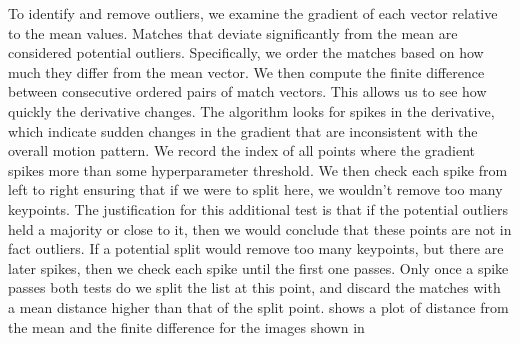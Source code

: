 To identify and remove outliers, we examine the gradient of each vector relative to the mean values. Matches that deviate significantly from the mean are considered potential outliers. Specifically, we order the matches based on how much they differ from the mean vector. We then compute the finite difference between consecutive ordered pairs of match vectors. This allows us to see how quickly the derivative changes. The algorithm looks for spikes in the derivative, which indicate sudden changes in the gradient that are inconsistent with the overall motion pattern. We record the index of all points where the gradient spikes more than some hyperparameter threshold. We then check each spike from left to right ensuring that if we were to split here, we wouldn't remove too many keypoints. The justification for this additional test is that if the potential outliers held a majority or close to it, then we would conclude that these points are not in fact outliers. If a potential split would remove too many keypoints, but there are later spikes, then we check each spike until the first one passes. Only once a spike passes both tests do we split the list at this point, and discard the matches with a mean distance higher than that of the split point.  shows a plot of distance from the mean and the finite difference for the images shown in \\

